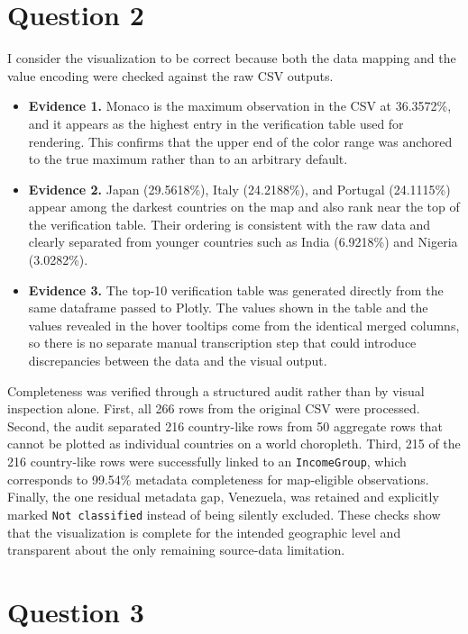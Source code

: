 \documentclass[11pt]{article}
\begin{document}
\section*{Question 2}

I consider the visualization to be correct because both the data mapping and the value encoding were checked against the raw CSV outputs.

\begin{itemize}
    \item \textbf{Evidence 1.} Monaco is the maximum observation in the CSV at 36.3572\%, and it appears as the highest entry in the verification table used for rendering. This confirms that the upper end of the color range was anchored to the true maximum rather than to an arbitrary default.
    \item \textbf{Evidence 2.} Japan (29.5618\%), Italy (24.2188\%), and Portugal (24.1115\%) appear among the darkest countries on the map and also rank near the top of the verification table. Their ordering is consistent with the raw data and clearly separated from younger countries such as India (6.9218\%) and Nigeria (3.0282\%).
    \item \textbf{Evidence 3.} The top-10 verification table was generated directly from the same dataframe passed to Plotly. The values shown in the table and the values revealed in the hover tooltips come from the identical merged columns, so there is no separate manual transcription step that could introduce discrepancies between the data and the visual output.
\end{itemize}

Completeness was verified through a structured audit rather than by visual inspection alone. First, all 266 rows from the original CSV were processed. Second, the audit separated 216 country-like rows from 50 aggregate rows that cannot be plotted as individual countries on a world choropleth. Third, 215 of the 216 country-like rows were successfully linked to an \texttt{IncomeGroup}, which corresponds to 99.54\% metadata completeness for map-eligible observations. Finally, the one residual metadata gap, Venezuela, was retained and explicitly marked \texttt{Not classified} instead of being silently excluded. These checks show that the visualization is complete for the intended geographic level and transparent about the only remaining source-data limitation.

\section*{Question 3}
\end{document}
